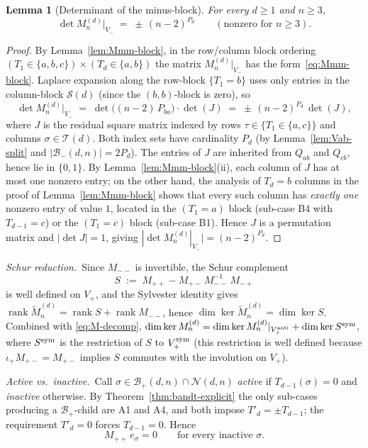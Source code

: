 \documentclass{amsart}
\newtheorem{lemma}[theorem]{Lemma}
\theoremstyle{definition}
\theoremstyle{remark}
\DeclareMathOperator{\rank}{rank}
\begin{document}
\begin{lemma}[Determinant of the minus-block]
\label{lem:det-Mmm}
For every $d \ge 1$ and $n \ge 3$,
\begin{equation}\label{eq:det-Mmm}
  \det M_n^{(d)}\big|_{V_-} \;=\; \pm\,(n-2)^{P_d}
  \qquad (\text{nonzero for } n \ge 3).
\end{equation}
\end{lemma}

\begin{proof}
By Lemma~\ref{lem:Mmm-block}, in the row/column block ordering
$(T_1 \in \{a, b, c\}) \times (T_d \in \{a, b\})$ the matrix
$M_n^{(d)}|_{V_-}$ has the form~\eqref{eq:Mmm-block}.  Laplace
expansion along the row-block $\{T_1 = b\}$ uses only entries
in the column-block $\mathcal{S}(d)$ (since the $(b, b)$-block
is zero), so
\[
  \det M_n^{(d)}|_{V_-}
  \;=\; \det\bigl((n - 2)\, P_{ba}\bigr) \cdot \det(J)
  \;=\; \pm\,(n - 2)^{P_d}\, \det(J),
\]
where $J$ is the residual square matrix indexed by rows
$\tau \in \{T_1 \in \{a, c\}\}$ and columns $\sigma \in
\mathcal{T}(d)$.  Both index sets have cardinality $P_d$
(by Lemma~\ref{lem:Vab-split} and
$|\mathcal{B}_-(d, n)| = 2 P_d$).  The entries of $J$ are
inherited from $Q_{ab}$ and $Q_{cb}$, hence lie in $\{0, 1\}$.
By Lemma~\ref{lem:Mmm-block}(ii), each column of $J$ has at
most one nonzero entry; on the other hand, the analysis of
$T_d = b$ columns in the proof of Lemma~\ref{lem:Mmm-block}
shows that every such column has \emph{exactly one} nonzero
entry of value $1$, located in the $(T_1 = a)$ block (sub-case
B4 with $T_{d-1} = c$) or the $(T_1 = c)$ block (sub-case B1).
Hence $J$ is a permutation matrix and $|\det J| = 1$, giving
$|\det M_n^{(d)}|_{V_-}| = (n - 2)^{P_d}$.
\end{proof}

\medskip
\noindent\textit{Schur reduction.}\
Since $M_{--}$ is invertible, the Schur complement
\[
  S \;:=\; M_{++} - M_{+-}\,M_{--}^{-1}\,M_{-+}
\]
is well defined on $V_+$, and the Sylvester identity gives
$\rank \widetilde M_n^{(d)} = \rank S + \rank M_{--}$, hence
$\dim \ker \widetilde M_n^{(d)} = \dim \ker S$.  Combined with
\eqref{eq:M-decomp}, $\dim \ker M_n^{(d)} = \dim \ker
M_n^{(d)}|_{V_+^{\rm anti}} + \dim \ker S^{\rm sym}$, where
$S^{\rm sym}$ is the restriction of $S$ to $V_+^{\rm sym}$
(this restriction is well defined because $\iota_+ M_{+-} =
M_{+-}$ implies $S$ commutes with the involution on $V_+$).

\smallskip
\noindent\textit{Active vs.\ inactive.}\
Call $\sigma \in \mathcal{B}_+(d, n) \cap \mathcal{N}(d, n)$
\emph{active} if $T_{d-1}(\sigma) = 0$ and \emph{inactive} otherwise.
By Theorem~\ref{thm:bandt-explicit} the only sub-cases producing
a $\mathcal{B}_+$-child are A1 and A4, and both impose
$T'_d = \pm T_{d-1}$; the requirement $T'_d = 0$ forces
$T_{d-1} = 0$.  Hence
\begin{equation}\label{eq:Mpp-inactive}
  M_{++}\,e_\sigma = 0 \qquad\text{for every inactive } \sigma.
\end{equation}
\end{document}
